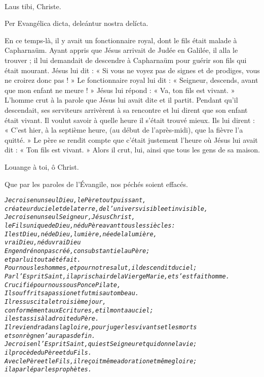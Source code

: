 \documentclass[twoside]{article}
\begin{document}
\begin{paracol}{2}
\\
\rr Laus tibi, Christe.

 Per Evangélica dicta, deleántur nostra delícta.

\switchcolumn

En ce temps-là, il y avait un fonctionnaire royal, dont le fils était malade à Capharnaüm.
Ayant appris que Jésus arrivait de Judée en Galilée, il alla le trouver ; il lui demandait de descendre à Capharnaüm pour guérir son fils qui était mourant.
Jésus lui dit : « Si vous ne voyez pas de signes et de prodiges, vous ne croirez donc pas ! »
Le fonctionnaire royal lui dit : « Seigneur, descends, avant que mon enfant ne meure ! »
Jésus lui répond : « Va, ton fils est vivant. » L’homme crut à la parole que Jésus lui avait dite et il partit.
Pendant qu’il descendait, ses serviteurs arrivèrent à sa rencontre et lui dirent que son enfant était vivant.
Il voulut savoir à quelle heure il s’était trouvé mieux. Ils lui dirent : « C’est hier, à la septième heure, (au début de l’après-midi), que la fièvre l’a quitté. »
Le père se rendit compte que c’était justement l’heure où Jésus lui avait dit : « Ton fils est vivant. » Alors il crut, lui, ainsi que tous les gens de sa maison.

\rr Louange à toi, ô Christ.

Que par les paroles de l’Évangile, nos péchés soient effacés.

\end{paracol}

\begin{alltt}\normalfont
\emph{Je crois en un seul Dieu, le Père tout puissant,
créateur du ciel et de la terre, de l’univers visible et invisible,
Je crois en un seul Seigneur, Jésus Christ,
le Fils unique de Dieu, né du Père avant tous les siècles :
Il est Dieu, né de Dieu, lumière, née de la lumière,
vrai Dieu, né du vrai Dieu
Engendré non pas créé, consubstantiel au Père ;
et par lui tout a été fait.
Pour nous les hommes, et pour notre salut, il descendit du ciel;
Par l’Esprit Saint, il a pris chair de la Vierge Marie, et s’est fait homme.
Crucifié pour nous sous Ponce Pilate,
Il souffrit sa passion et fut mis au tombeau.
Il ressuscita le troisième jour,
conformément aux Ecritures, et il monta au ciel;
il est assis à la droite du Père.
Il reviendra dans la gloire, pour juger les vivants et les morts
et son règne n’aura pas de fin.
Je crois en l’Esprit Saint, qui est Seigneur et qui donne la vie;
il procède du Père et du Fils.
Avec le Père et le Fils, il reçoit même adoration et même gloire;
il a parlé par les prophètes.}
\end{alltt}
\end{document}
